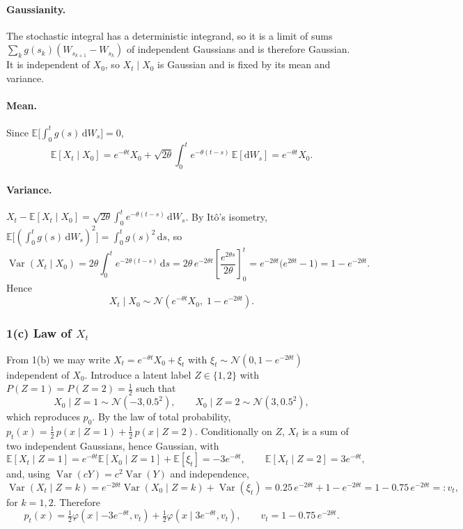 \documentclass[11pt]{article}
\newcommand{\E}{\mathbb{E}}
\newcommand{\Var}{\operatorname{Var}}
\newcommand{\N}{\mathcal{N}}
\newcommand{\dd}{\mathrm{d}}
\begin{document}
\paragraph{Gaussianity.} The stochastic integral has a deterministic integrand, so it is a limit of
sums $\sum_k g(s_k)(W_{s_{k+1}}-W_{s_k})$ of independent Gaussians and is therefore Gaussian. It is
independent of $X_0$, so $X_t\mid X_0$ is Gaussian and is fixed by its mean and variance.

\paragraph{Mean.} Since $\E\bigl[\int_0^t g(s)\,\dd W_s\bigr]=0$,
\[
\E[X_t\mid X_0] = e^{-\theta t}X_0 + \sqrt{2\theta}\int_0^t e^{-\theta(t-s)}\,\E[\dd W_s] = e^{-\theta t}X_0 .
\]

\paragraph{Variance.} $X_t - \E[X_t\mid X_0] = \sqrt{2\theta}\int_0^t e^{-\theta(t-s)}\,\dd W_s$. By It\^o's isometry,
$\E\bigl[(\int_0^t g(s)\,\dd W_s)^2\bigr] = \int_0^t g(s)^2\,\dd s$, so
\[
\Var(X_t\mid X_0) = 2\theta\int_0^t e^{-2\theta(t-s)}\,\dd s
= 2\theta\, e^{-2\theta t}\left[\frac{e^{2\theta s}}{2\theta}\right]_0^t
= e^{-2\theta t}\bigl(e^{2\theta t}-1\bigr) = 1 - e^{-2\theta t}.
\]
Hence
\[
\boxed{X_t\mid X_0 \sim \N\!\left(e^{-\theta t}X_0,\; 1-e^{-2\theta t}\right).}
\]

\subsubsection*{1(c) Law of $X_t$}

From 1(b) we may write $X_t = e^{-\theta t}X_0 + \xi_t$ with $\xi_t\sim\N(0,1-e^{-2\theta t})$ independent of $X_0$.
Introduce a latent label $Z\in\{1,2\}$ with $P(Z=1)=P(Z=2)=\tfrac12$ such that
\[
X_0\mid Z=1 \sim \N(-3,0.5^2),\qquad X_0\mid Z=2 \sim \N(3,0.5^2),
\]
which reproduces $p_0$. By the law of total probability,
$p_t(x) = \tfrac12\,p(x\mid Z=1) + \tfrac12\,p(x\mid Z=2)$.
Conditionally on $Z$, $X_t$ is a sum of two independent Gaussians, hence Gaussian, with
\[
\E[X_t\mid Z=1] = e^{-\theta t}\E[X_0\mid Z=1] + \E[\xi_t] = -3e^{-\theta t},\qquad
\E[X_t\mid Z=2] = 3e^{-\theta t},
\]
and, using $\Var(cY)=c^2\Var(Y)$ and independence,
\[
\Var(X_t\mid Z=k) = e^{-2\theta t}\Var(X_0\mid Z=k) + \Var(\xi_t)
= 0.25\,e^{-2\theta t} + 1 - e^{-2\theta t} = 1 - 0.75\,e^{-2\theta t} =: v_t ,
\]
for $k=1,2$. Therefore
\[
\boxed{p_t(x) = \tfrac12\varphi\!\left(x\mid -3e^{-\theta t}, v_t\right) + \tfrac12\varphi\!\left(x\mid 3e^{-\theta t}, v_t\right),
\qquad v_t = 1-0.75\,e^{-2\theta t}.}
\]
\end{document}
